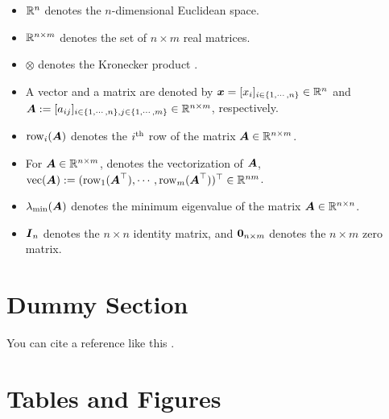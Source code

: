 \documentclass[conference]{IEEEtran}
\begin{document}
\begin{itemize}
    \item $\mathbb{R}^n$ denotes the $n$-dimensional Euclidean space.
    \item $\mathbb{R}^{n\times m}$ denotes the set of $n\times m$ real matrices.
    \item $\otimes$ denotes the Kronecker product \cite[Chap. 7 Def. 7.1.2]{Bernstein:2009aa}.
    \item A vector and a matrix are denoted by $\boldsymbol{x}=[x_i]_{i\in\{1,\cdots,n\}}\in\mathbb{R}^n$ and $
        \boldsymbol{A}
        := 
        [a_{ij}]
        _{
            i\in\{1,\cdots,n\},j\in\{1,\cdots ,m\}
        }\allowbreak\in\mathbb{R}^{n\times m}
        $, respectively.
    \item $\operatorname{row}_i(\boldsymbol{A})$ denotes the $i\textsuperscript{th}$ row of the matrix $\boldsymbol{A}\in\mathbb{R}^{n\times m}$. 
    \item For $\boldsymbol{A}\in\mathbb{R}^{n\times m}$, denotes the vectorization of $\boldsymbol{A}$, $\operatorname{vec}(\boldsymbol{A}):=(\operatorname{row}_1(\boldsymbol{A}^\top),\cdots,\operatorname{row}_m(\boldsymbol{A}^\top)  )^\top\in\mathbb{R}^{nm}$.
    \item $\lambda_{\min}(\boldsymbol{A})$ denotes the minimum eigenvalue of the matrix $\boldsymbol{A}\in\mathbb{R}^{n\times n}$.
    \item $\boldsymbol{I}_n$ denotes the $n\times n$ identity matrix, and $\boldsymbol{0}_{n\times m}$ denotes the $n\times m$ zero matrix.
\end{itemize}

\section{Dummy Section}

You can cite a reference like this \cite{Ryu:2024aa}.

\lipsum[1-3]

\section{Tables and Figures}
\end{document}
